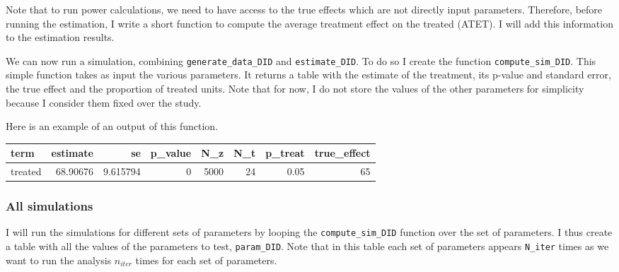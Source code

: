 \documentclass[
]{article}
\newenvironment{Shaded}{\begin{snugshade}}{\end{snugshade}}
\newcommand{\AttributeTok}[1]{\textcolor[rgb]{0.13,0.29,0.53}{#1}}
\newcommand{\ControlFlowTok}[1]{\textcolor[rgb]{0.13,0.29,0.53}{\textbf{#1}}}
\newcommand{\FunctionTok}[1]{\textcolor[rgb]{0.13,0.29,0.53}{\textbf{#1}}}
\newcommand{\NormalTok}[1]{#1}
\newcommand{\OtherTok}[1]{\textcolor[rgb]{0.56,0.35,0.01}{#1}}
\newcommand{\SpecialCharTok}[1]{\textcolor[rgb]{0.81,0.36,0.00}{\textbf{#1}}}
\begin{document}
Note that to run power calculations, we need to have access to the true
effects which are not directly input parameters. Therefore, before
running the estimation, I write a short function to compute the average
treatment effect on the treated (ATET). I will add this information to
the estimation results.

\begin{Shaded}
\end{Shaded}

We can now run a simulation, combining \texttt{generate\_data\_DID} and
\texttt{estimate\_DID}. To do so I create the function
\texttt{compute\_sim\_DID}. This simple function takes as input the
various parameters. It returns a table with the estimate of the
treatment, its p-value and standard error, the true effect and the
proportion of treated units. Note that for now, I do not store the
values of the other parameters for simplicity because I consider them
fixed over the study.

Here is an example of an output of this function.

\begin{longtable}[]{@{}lrrrrrrr@{}}
\toprule\noalign{}
term & estimate & se & p\_value & N\_z & N\_t & p\_treat &
true\_effect \\
\midrule\noalign{}
\endhead
\bottomrule\noalign{}
\endlastfoot
treated & 68.90676 & 9.615794 & 0 & 5000 & 24 & 0.05 & 65 \\
\end{longtable}

\hypertarget{all-simulations}{%
\subsubsection{All simulations}\label{all-simulations}}

I will run the simulations for different sets of parameters by looping
the \texttt{compute\_sim\_DID} function over the set of parameters. I
thus create a table with all the values of the parameters to test,
\texttt{param\_DID}. Note that in this table each set of parameters
appears \texttt{N\_iter} times as we want to run the analysis
\(n_{iter}\) times for each set of parameters.
\end{document}
